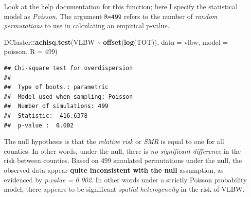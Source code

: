 \documentclass[
]{book}
\newenvironment{Shaded}{\begin{snugshade}}{\end{snugshade}}
\newcommand{\AttributeTok}[1]{\textcolor[rgb]{0.13,0.29,0.53}{#1}}
\newcommand{\DecValTok}[1]{\textcolor[rgb]{0.00,0.00,0.81}{#1}}
\newcommand{\FunctionTok}[1]{\textcolor[rgb]{0.13,0.29,0.53}{\textbf{#1}}}
\newcommand{\NormalTok}[1]{#1}
\newcommand{\SpecialCharTok}[1]{\textcolor[rgb]{0.81,0.36,0.00}{\textbf{#1}}}
\newcommand{\StringTok}[1]{\textcolor[rgb]{0.31,0.60,0.02}{#1}}
\begin{document}
Look at the help documentation for this function; here I specify the statistical model as \emph{Poisson}. The argument \texttt{R=499} refers to the number of \emph{random permutations} to use in calculating an empirical p-value.

\begin{Shaded}
\begin{Highlighting}[]
\NormalTok{DCluster}\SpecialCharTok{::}\FunctionTok{achisq.test}\NormalTok{(VLBW }\SpecialCharTok{\textasciitilde{}} \FunctionTok{offset}\NormalTok{(}\FunctionTok{log}\NormalTok{(TOT)), }
                      \AttributeTok{data =}\NormalTok{ vlbw, }
                      \AttributeTok{model =} \StringTok{\textquotesingle{}poisson\textquotesingle{}}\NormalTok{,}
                      \AttributeTok{R =} \DecValTok{499}\NormalTok{)}
\end{Highlighting}
\end{Shaded}

\begin{verbatim}
## Chi-square test for overdispersion 
## 
##  Type of boots.: parametric 
##  Model used when sampling: Poisson 
##  Number of simulations: 499 
##  Statistic:  416.6378 
##  p-value :  0.002
\end{verbatim}

The null hypothesis is that the \emph{relative risk} or \emph{SMR} is equal to one for all counties. In other words, under the null, there is \emph{no significant difference} in the risk between counties. Based on 499 simulated permutations under the null, the observed data appear \textbf{quite inconsistent with the null} assumption, as evidenced by \emph{p.value = 0.002}. In other words under a strictly Poisson probability model, there appears to be significant \emph{spatial heterogeneity} in the risk of VLBW.
\end{document}
